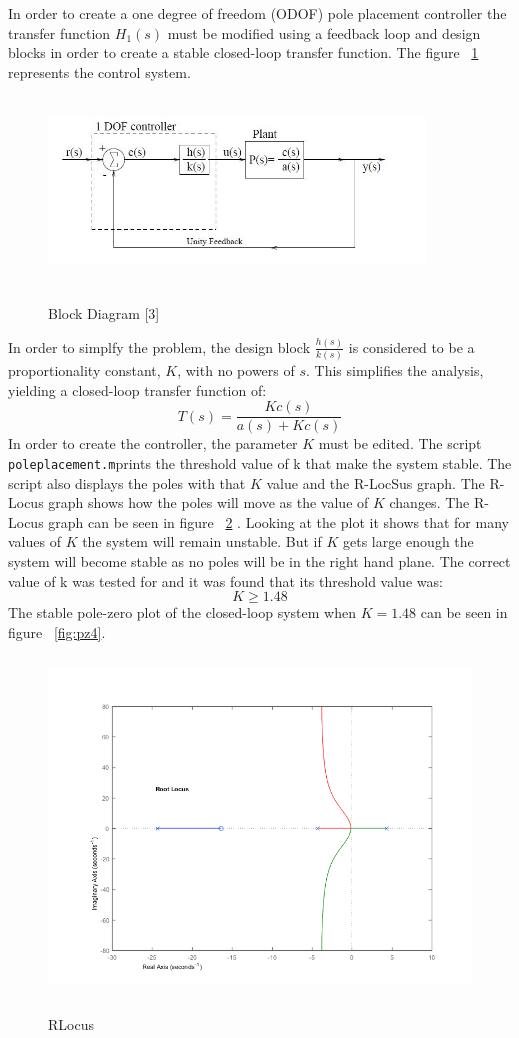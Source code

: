 \documentclass[12pt]{article} %
\begin{document}
In order to create a one degree of freedom (ODOF) pole placement controller the transfer function $H_1(s)$ must be modified using a feedback loop and design blocks in order to create a stable closed-loop transfer function. The figure ~\ref{fig:one_dof_block} represents the control system.
\begin{figure}[h] 
\caption{Block Diagram [3]}
\includegraphics[height=5cm, width = 10cm]{one_dof_block.jpg}
\label{fig:one_dof_block}
\centering
\end{figure}
In order to simplfy the problem, the design block $\frac{h(s)}{k(s)}$ is considered to be a proportionality constant, $K$, with no powers of $s$. This simplifies the analysis, yielding a closed-loop transfer function of:
\begin{equation}
T(s) = \frac{Kc(s)}{a(s) + Kc(s)}
\end{equation}In order to create the controller, the parameter $K$ must be edited. The script \texttt{poleplacement.m}prints the threshold value of k that make the system stable. The script also displays the poles with that $K$ value and the R-LocSus graph. The R-Locus graph shows how the poles will move as the value of $K$ changes. The R-Locus graph can be seen in figure ~\ref{fig:root} . Looking at the plot it shows that for many values of $K$ the system will remain unstable. But if $K$ gets large enough the system will become stable as no poles will be in the right hand plane. The correct value of k was tested for and it was found that its threshold value was: 
\begin{equation}
K \geq 1.48
\end{equation}
The stable pole-zero plot of the closed-loop system when $K = 1.48$ can be seen in figure ~\ref{fig:pz4}. 
\begin{figure}
\caption{RLocus}
\includegraphics[height=9cm, width = 15cm]{polePlacementLotus.png}
\label{fig:root}
\centering
\end{figure}
\end{document}
